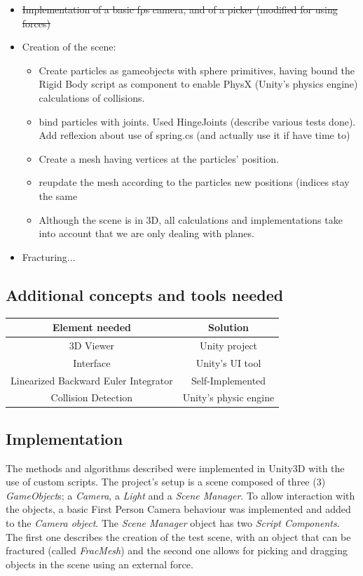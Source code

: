 \documentclass[tog]{acmsiggraph}
\begin{document}
\begin{itemize}
\item \sout{Implementation of a basic fps camera, and of a picker (modified for using forces)}  
\item Creation of the scene: 
	\begin{itemize}
	\item Create particles as gameobjects with sphere primitives, having bound the Rigid Body script as component to enable PhysX (Unity's physics engine) calculations of collisions.
	\item bind particles with joints. Used HingeJoints (describe various tests done). Add reflexion about use of spring.cs (and actually use it if have time to)
	\item Create a mesh having vertices at the particles' position. 
	\item reupdate the mesh according to the particles new positions (indices stay the same
	\item Although the scene is in 3D, all calculations and implementations take into account that we are only dealing with planes.  
	\end{itemize}
\item Fracturing...

\end{itemize}


\subsection{Additional concepts and tools needed}

\begin{tabular}{|c|c|}
\hline
Element needed & Solution\\
\hline
\hline
3D Viewer & Unity project\\
Interface & Unity's UI tool \\
Linearized Backward Euler Integrator & Self-Implemented\\
Collision Detection & Unity's physic engine\\
\hline
\end{tabular}

\subsection{Implementation}

The methods and algorithms described were implemented in Unity3D with the use of custom scripts. The project's setup is a scene composed of three (3) \textit{GameObject}s; a \textit{Camera}, a \textit{Light} and a \textit{Scene Manager}. To allow interaction with the objects, a basic First Person Camera behaviour was implemented and added to the \textit{Camera object}. The \textit{Scene Manager} object has two \textit{Script Components}. The first one describes the creation of the test scene, with an object that can be fractured (called \textit{FracMesh}) and the second one allows for picking and dragging objects in the scene using an external force. 
\end{document}

